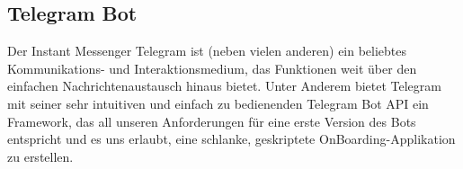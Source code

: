     \subsection{Telegram Bot}
        Der Instant Messenger Telegram ist (neben vielen anderen) ein beliebtes Kommunikations- und Interaktionsmedium, das Funktionen weit über den einfachen Nachrichtenaustausch hinaus bietet. Unter Anderem bietet Telegram mit seiner sehr intuitiven und einfach zu bedienenden Telegram Bot API ein Framework, das all unseren Anforderungen für eine erste Version des Bots entspricht und es uns erlaubt, eine schlanke, geskriptete OnBoarding-Applikation zu erstellen.
